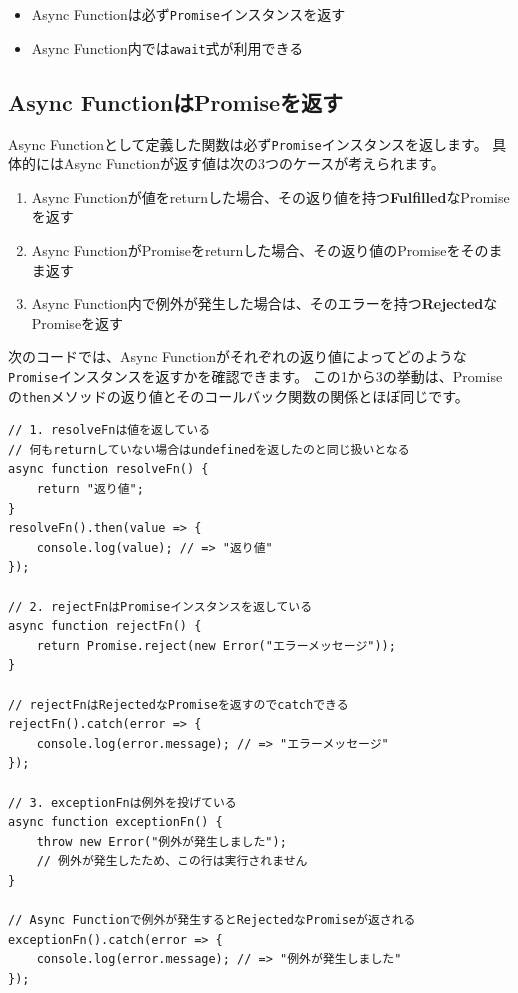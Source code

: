 \begin{itemize}
\item
  Async
  Functionは必ず\texttt{Promise}インスタンスを返す
\item
  Async Function内では\texttt{await}式が利用できる
\end{itemize}

\hypertarget{async-function-return-promise}{%
\subsection{Async
FunctionはPromiseを返す}\label{async-function-return-promise}}

Async
Functionとして定義した関数は必ず\texttt{Promise}インスタンスを返します。
具体的にはAsync Functionが返す値は次の3つのケースが考えられます。

\begin{enumerate}
\def\labelenumi{\arabic{enumi}.}
\item
  Async
  Functionが値をreturnした場合、その返り値を持つ\textbf{Fulfilled}なPromiseを返す
\item
  Async
  FunctionがPromiseをreturnした場合、その返り値のPromiseをそのまま返す
\item
  Async
  Function内で例外が発生した場合は、そのエラーを持つ\textbf{Rejected}なPromiseを返す
\end{enumerate}

\enlargethispage{\baselineskip}次のコードでは、Async
Functionがそれぞれの返り値によってどのような\texttt{Promise}インスタンスを返すかを確認できます。
この1から3の挙動は、Promiseの\texttt{then}メソッドの返り値とそのコールバック関数の関係とほぼ同じです。

\begin{lstlisting}
// 1. resolveFnは値を返している
// 何もreturnしていない場合はundefinedを返したのと同じ扱いとなる
async function resolveFn() {
    return "返り値";
}
resolveFn().then(value => {
    console.log(value); // => "返り値"
});

// 2. rejectFnはPromiseインスタンスを返している
async function rejectFn() {
    return Promise.reject(new Error("エラーメッセージ"));
}

// rejectFnはRejectedなPromiseを返すのでcatchできる
rejectFn().catch(error => {
    console.log(error.message); // => "エラーメッセージ"
});

// 3. exceptionFnは例外を投げている
async function exceptionFn() {
    throw new Error("例外が発生しました");
    // 例外が発生したため、この行は実行されません
}

// Async Functionで例外が発生するとRejectedなPromiseが返される
exceptionFn().catch(error => {
    console.log(error.message); // => "例外が発生しました"
});
\end{lstlisting}

